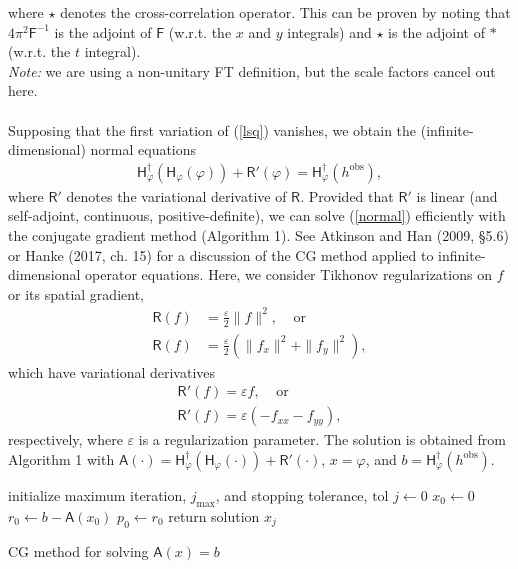 \documentclass[paper=a4, fontsize=11pt]{article}
\begin{document}
where $\star  $ denotes the cross-correlation operator.
This can be proven by noting that ${4\pi^2}\mathsf{F}^{-1}$ is the adjoint of $\mathsf{F}$ (w.r.t. the $x$ and $y$ integrals)
and $\star$ is the adjoint of $*$ (w.r.t. the $t$ integral).
\\
{\footnotesize{\noindent
\emph{Note:} we are using a non-unitary FT definition, but the scale factors
cancel out here.}} \\ \\
Supposing that the first variation of (\ref{lsq}) vanishes, we obtain the
(infinite-dimensional) normal equations
\begin{align}
\mathsf{H}_\varphi^\dagger (\mathsf{H}_\varphi(\varphi)) + \mathsf{R}'(\varphi) = \mathsf{H}_\varphi^\dagger (h^{\mathrm{obs}}), \label{normal}
\end{align}
where $\mathsf{R}'$ denotes the variational derivative of $\mathsf{R}$.
Provided that $\mathsf{R}'$ is linear (and self-adjoint, continuous, positive-definite),
we can solve (\ref{normal})
efficiently with the conjugate gradient method (Algorithm 1).
See Atkinson and Han (2009, \S 5.6) or Hanke (2017, ch. 15) for a discussion
of the CG method applied to infinite-dimensional operator equations.
Here, we consider Tikhonov regularizations on $f$ or its spatial gradient,
\begin{align}
\mathsf{R}(f)&=\frac{\varepsilon}{2}\|f\|^2,\;\;\;\; \text{or}\\
\mathsf{R}(f)&=\frac{\varepsilon}{2}(\|f_x\|^2+\|f_y\|^2),
\end{align}
which have variational derivatives
\begin{align}
\mathsf{R}'(f) = \varepsilon f, \;\;\;\; \text{or} \\
\mathsf{R}'(f) = \varepsilon (-f_{xx}-f_{yy}),
\end{align}
respectively, where $\varepsilon$ is a regularization parameter.
The solution is obtained from Algorithm 1 with $\mathsf{A}(\cdot) = \mathsf{H}_\varphi^\dagger(\mathsf{H}_\varphi(\cdot)) + \mathsf{R}'(\cdot) $, $x=\varphi$, and $b=\mathsf{H}_\varphi^\dagger (h^{\mathrm{obs}})$.

\begin{algorithm}[H]
\SetAlgoLined
initialize maximum iteration, $j_\mathrm{max}$, and stopping tolerance, $\mathrm{tol}$\;
 $j \gets 0$\;
 $x_0 \gets 0$\;
 ${r_0} \gets b - \mathsf{A}(x_0)$\;
 $p_0 \gets r_0$\;
 return solution $x_j$\;
 \caption{CG method for solving $\mathsf{A}(x)=b$ }
\end{algorithm}
\end{document}
